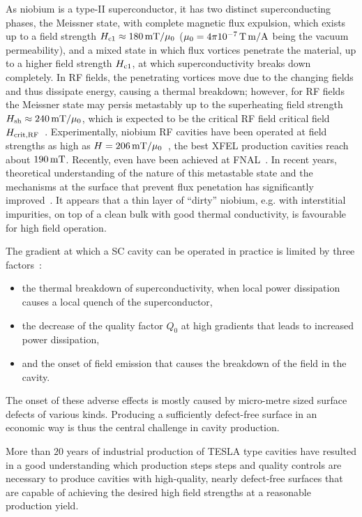 As niobium is a type-II superconductor, it has two distinct superconducting phases, the Meissner state, with complete magnetic flux expulsion, which exists up to a field strength $H_{\mathrm{c1}} \approx 180\,{\mathrm{mT}}/\mu_0$ ($\mu_0 = 4\pi 10^{-7}\,{\mathrm{T\,m/A}}$ being the vacuum permeability), and a mixed state in which flux vortices penetrate the material, up to a higher field strength $H_{\mathrm{c1}}$, at which superconductivity breaks down completely.
In RF fields, the penetrating vortices move due to the changing fields and thus dissipate energy, causing a thermal breakdown; 
however, for RF fields the Meissner state may persis metastably up to the superheating field strength $H_{\mathrm{sh}} \approx 240\,{\mathrm{mT}}/\mu_0$, which is expected to be the critical RF field critical field $H_{\mathrm{crit,RF}}$~\cite{Padamsee:1998vf}.
Experimentally, niobium RF cavities have been operated at field strengths as high as $H=206\,{\mathrm{mT}}/\mu_0$~\cite{Eremeev:2007zza}, the best XFEL production cavities reach about $190\,{\mathrm{mT}}$.
Recently, even  have been achieved at FNAL~\cite{Grassellino:2018tqg}.
In recent years, theoretical understanding of the nature of this metastable state and the mechanisms at the surface that prevent flux penetation has significantly improved~\cite{Gurevich:2017vnn,Kubo:2017cww}.
It appears that a thin layer of ``dirty'' niobium, e.g. with interstitial impurities, on top of a clean bulk with good thermal conductivity, is favourable for high field operation.  

The gradient at which a SC cavity can be operated in practice is limited by three factors~\cite{Padamsee:1998vf}:
\begin{itemize}
\item the thermal breakdown of superconductivity, when local power dissipation causes a local quench of the superconductor,
\item the decrease of the quality factor $Q_0$ at high gradients that leads to increased power dissipation,
\item and the onset of field emission that causes the breakdown of the field in the cavity.
\end{itemize}
The onset of these adverse effects is mostly caused by micro-metre sized surface defects of various kinds. 
Producing a sufficiently defect-free surface in an economic way is thus the central challenge in cavity production.

More than $20$ years of industrial production of TESLA type cavities have resulted in a good understanding which production steps steps and quality controls are necessary to produce cavities with high-quality, nearly defect-free surfaces that are capable of achieving the desired high field strengths at a reasonable production yield.

